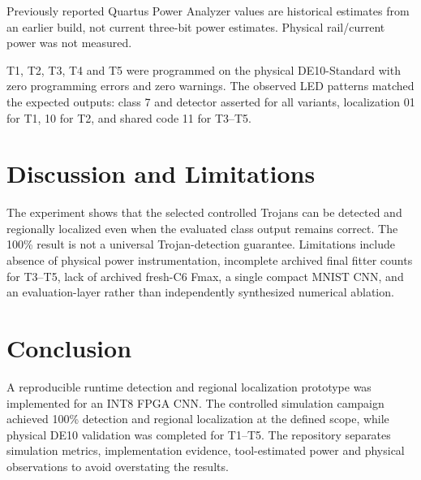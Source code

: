\documentclass[conference]{IEEEtran}
\begin{document}
Previously reported Quartus Power Analyzer values are historical estimates from an earlier build, not current three-bit power estimates. Physical rail/current power was not measured.

T1, T2, T3, T4 and T5 were programmed on the physical DE10-Standard with zero programming errors and zero warnings. The observed LED patterns matched the expected outputs: class 7 and detector asserted for all variants, localization 01 for T1, 10 for T2, and shared code 11 for T3--T5.

\section{Discussion and Limitations}
The experiment shows that the selected controlled Trojans can be detected and regionally localized even when the evaluated class output remains correct. The 100\% result is not a universal Trojan-detection guarantee. Limitations include absence of physical power instrumentation, incomplete archived final fitter counts for T3--T5, lack of archived fresh-C6 Fmax, a single compact MNIST CNN, and an evaluation-layer rather than independently synthesized numerical ablation.

\section{Conclusion}
A reproducible runtime detection and regional localization prototype was implemented for an INT8 FPGA CNN. The controlled simulation campaign achieved 100\% detection and regional localization at the defined scope, while physical DE10 validation was completed for T1--T5. The repository separates simulation metrics, implementation evidence, tool-estimated power and physical observations to avoid overstating the results.



\end{document}
